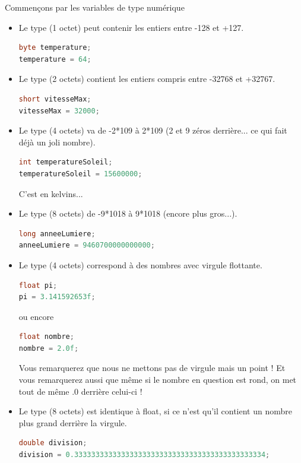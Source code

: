\documentclass[a4paper,twoside]{article}
\begin{document}
Commençons par les variables de type numérique
\begin{itemize}
\item Le type  (1 octet) peut contenir les entiers entre -128 et +127.
\begin{lstlisting}[language=java]
byte temperature;
temperature = 64;
\end{lstlisting}

\item Le type  (2 octets) contient les entiers compris entre -32768 et +32767.
\begin{lstlisting}[language=java]
short vitesseMax;
vitesseMax = 32000;
\end{lstlisting}

\item Le type  (4 octets) va de -2*109 à 2*109 (2 et 9 zéros derrière... ce qui fait déjà un joli nombre).
\begin{lstlisting}[language=java]
int temperatureSoleil;
temperatureSoleil = 15600000;
\end{lstlisting}
C'est en kelvins...

\item Le type (8 octets) de -9*1018 à 9*1018 (encore plus gros...).
\begin{lstlisting}[language=java]
long anneeLumiere;
anneeLumiere = 9460700000000000;
\end{lstlisting}

\item Le type  (4 octets) correspond à des nombres avec virgule flottante.
\begin{lstlisting}[language=java]
float pi;
pi = 3.141592653f;
\end{lstlisting}
ou encore
\begin{lstlisting}[language=java]
float nombre;
nombre = 2.0f;
\end{lstlisting}

Vous remarquerez que nous ne mettons pas de virgule mais un point ! Et vous remarquerez aussi que même si le nombre en question est rond, on met tout de même .0 derrière celui-ci !

\item Le type  (8 octets) est identique à float, si ce n'est qu'il contient un nombre plus grand derrière la virgule.
\begin{lstlisting}[language=java]
double division;
division = 0.333333333333333333333333333333333333333333334;
\end{lstlisting}
\end{itemize}
\end{document}
